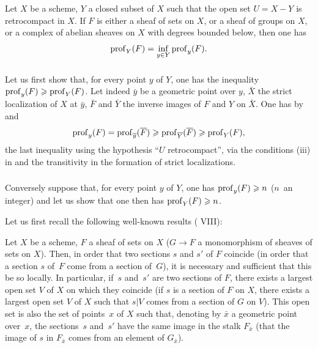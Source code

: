\begin{theorem} \label{XIV.1.8} Let $X$ be a scheme, $Y$ a closed subset of $X$ such that the open set $U=X-Y$ is retrocompact in $X$. If $F$ is either a sheaf of sets on $X$, or a sheaf of groups on $X$, or a complex of abelian sheaves on $X$ with degrees bounded below, then one has
$$
\operatorname{prof}_Y(F)=\inf_{y\in Y} \operatorname{prof}_y(F).
$$
\end{theorem}

\subsubsection{} \label{XIV.1.8.1} Let us first show that, for every point $y$ of $Y$, one has the inequality $\operatorname{prof}_y(F)\geqslant \operatorname{prof}_Y(F)$. Let indeed $\bar y$ be a geometric point over $y$, $\bar X$ the strict localization of $X$ at $\bar y$, $\bar F$ and $\bar Y$ the inverse images of $F$ and $Y$ on $\bar X$. One has by  and 
$$
\operatorname{prof}_y(F)=\operatorname{prof}_{\overline y}(\overline F)\geqslant \operatorname{prof}_{\overline Y}(\overline F)\geqslant \operatorname{prof}_Y(F),
$$
the last inequality using the hypothesis ``$U$ retrocompact'', via the conditions \textup{(iii)} in  and the transitivity in the formation of strict localizations.

\subsubsection{} \label{XIV.1.8.2}
Conversely suppose that, for every point $y$ of $Y$, one has $\operatorname{prof}_y(F)\geqslant n$ ($n$~an integer) and let us show that one then has $\operatorname{prof}_Y(F)\geqslant n$.

Let us first recall the following well-known results \textup{( VIII)}:

\begin{subsublemma} \label{XIV.1.8.2.1}
Let $X$ be a scheme, $F$ a sheaf of sets on $X$ (\resp $G\to F$ a monomorphism of sheaves of sets on $X$). Then, in order that two sections $s$ and $s'$ of $F$ coincide (\resp in order that a section $s$ of~$F$ come from a section of~$G$), it is necessary and sufficient that this be so locally. In particular, if~$s$ and~$s'$ are two sections of $F$, there exists a largest open set $V$ of $X$ on which they coincide (\resp if $s$ is a section of $F$ on $X$, there exists a largest open set $V$ of $X$ such that $s|V$ comes from a section of $G$ on $V$). This open set is also the set of points~$x$ of $X$ such that, denoting by $\bar x$ a geometric point over~$x$, the sections~$s$ and~$s'$ have the same image in the stalk $F_{\bar x}$ (\resp that the image of $s$ in $F_{\bar x}$ comes from an element of $G_{\bar x}$).
\end{subsublemma}

